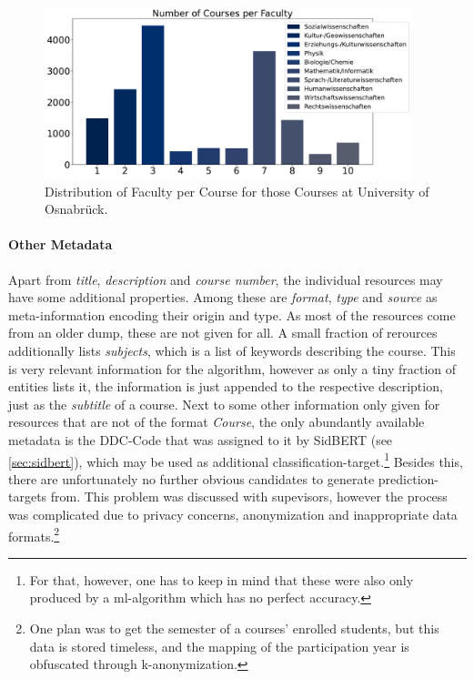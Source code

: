 \begin{figure}[h]
	\centering
	\includegraphics[width=0.95\textwidth]{graphics/dataset_new/courses_per_faculty.pdf}
	\caption{Distribution of Faculty per Course for those Courses at University of Osnabrück.}
	\label{fig:courses_per_faculty}
\end{figure}

\paragraph{Other Metadata}

Apart from \textit{title}, \textit{description} and \textit{course number}, the individual resources may have some additional properties. Among these are \textit{format}, \textit{type} and \textit{source} as meta-information encoding their origin and type. As most of the resources come from an older dump, these are not given for all. A small fraction of rerources additionally lists \textit{subjects}, which is a list of keywords describing the course. This is very relevant information for the algorithm, however as only a tiny fraction of entities lists it, the information is just appended to the respective description, just as the \textit{subtitle} of a course. Next to some other information only given for resources that are not of the format \textit{Course}, the only abundantly available metadata is the DDC-Code that was assigned to it by SidBERT (see \autoref{sec:sidbert}), which may be used as additional classification-target.\footnote{For that, however, one has to keep in mind that these were also only produced by a \gls{ml}-algorithm which has no perfect accuracy.} Besides this, there are unfortunately no further obvious candidates to generate prediction-targets from. This problem was discussed with \my supevisors, however the process was complicated due to privacy concerns, anonymization and inappropriate data formats.\footnote{One plan was to get the semester of a courses' enrolled students, but this data is stored timeless, and the mapping of the participation year is obfuscated through k-anonymization.}


